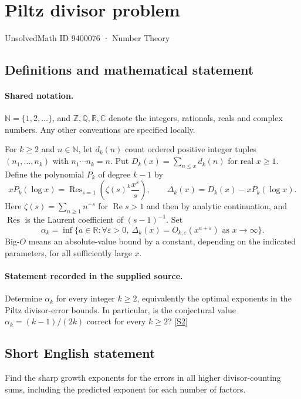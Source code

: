 \documentclass[11pt]{article}
\newcommand{\sref}[2]{\hyperlink{source:#1:#2}{[S#2]}}
\begin{document}
\setcounter{section}{9400075}
\section{Piltz divisor problem}\label{9400076}
{\small\sffamily UnsolvedMath ID 9400076 · Number Theory}
\subsection{Definitions and mathematical statement}

\paragraph{Shared notation.}$\mathbb N=\{1,2,\ldots\}$, and $\mathbb Z,\mathbb Q,\mathbb R,\mathbb C$ denote the integers, rationals, reals and complex numbers. Any other conventions are specified locally.


For $k\ge2$ and $n\in\mathbb N$, let $d_k(n)$ count ordered positive integer tuples $(n_1,\ldots,n_k)$ with $n_1\cdots n_k=n$. Put $D_k(x)=\sum_{n\le x}d_k(n)$ for real $x\ge1$. Define the polynomial $P_k$ of degree $k-1$ by
\[
xP_k(\log x)=\operatorname{Res}_{s=1}\left(\zeta(s)^k\frac{x^s}{s}\right),\qquad
\Delta_k(x)=D_k(x)-xP_k(\log x).
\]
Here $\zeta(s)=\sum_{n\ge1}n^{-s}$ for $\operatorname{Re}s>1$ and then by analytic continuation, and $\operatorname{Res}$ is the Laurent coefficient of $(s-1)^{-1}$. Set
\[
\alpha_k=\inf\{a\in\mathbb R:\forall\varepsilon>0,\ \Delta_k(x)=O_{k,\varepsilon}(x^{a+\varepsilon})\text{ as }x\to\infty\}.
\]
Big-$O$ means an absolute-value bound by a constant, depending on the indicated parameters, for all sufficiently large $x$.
\paragraph{Statement recorded in the supplied source.}
Determine $\alpha_k$ for every integer $k\ge2$, equivalently the optimal exponents in the Piltz divisor-error bounds. In particular, is the conjectural value $\alpha_k=(k-1)/(2k)$ correct for every $k\ge2$? \sref{9400076}{2}
\subsection{Short English statement}
Find the sharp growth exponents for the errors in all higher divisor-counting sums, including the predicted exponent for each number of factors.
\end{document}
